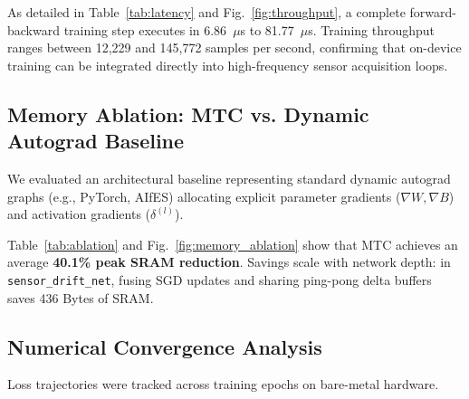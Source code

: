 \documentclass[conference]{IEEEtran}
\begin{document}
As detailed in Table~\ref{tab:latency} and Fig.~\ref{fig:throughput}, a complete forward-backward training step executes in 6.86~$\mu$s to 81.77~$\mu$s. Training throughput ranges between 12,229 and 145,772 samples per second, confirming that on-device training can be integrated directly into high-frequency sensor acquisition loops.

\subsection{Memory Ablation: MTC vs. Dynamic Autograd Baseline}
We evaluated an architectural baseline representing standard dynamic autograd graphs (e.g., PyTorch, AIfES) allocating explicit parameter gradients ($\nabla W, \nabla B$) and activation gradients ($\delta^{(l)}$).

\begin{table}[t]
\centering
\caption{Peak SRAM Ablation: Baseline Autograd vs. MTC Static Planner}
\label{tab:ablation}
\end{table}

Table~\ref{tab:ablation} and Fig.~\ref{fig:memory_ablation} show that MTC achieves an average \textbf{40.1\% peak SRAM reduction}. Savings scale with network depth: in \texttt{sensor\_drift\_net}, fusing SGD updates and sharing ping-pong delta buffers saves 436 Bytes of SRAM.

\subsection{Numerical Convergence Analysis}
Loss trajectories were tracked across training epochs on bare-metal hardware.
\end{document}
